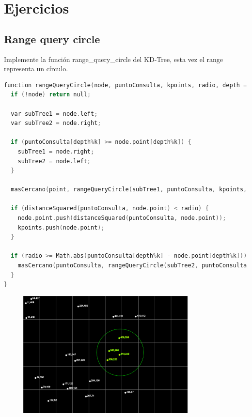\section{Ejercicios}
\subsection{Range query circle}
Implemente la función range\_query\_circle del KD-Tree, esta vez el range representa un círculo.
\begin{lstlisting}[language=c++,
                   directivestyle={\color{black}}
                   emph={int,char,double,float,unsigned},
                   emphstyle={\color{blue}}
                  ]
function rangeQueryCircle(node, puntoConsulta, kpoints, radio, depth = 0) {
  if (!node) return null;

  var subTree1 = node.left;
  var subTree2 = node.right;

  if (puntoConsulta[depth%k] >= node.point[depth%k]) {
    subTree1 = node.right;
    subTree2 = node.left;
  }

  masCercano(point, rangeQueryCircle(subTree1, puntoConsulta, kpoints, radio, depth + 1), node.point);

  if (distanceSquared(puntoConsulta, node.point) < radio) {
    node.point.push(distanceSquared(puntoConsulta, node.point));
    kpoints.push(node.point);
  }

  if (radio >= Math.abs(puntoConsulta[depth%k] - node.point[depth%k])) {
    masCercano(puntoConsulta, rangeQueryCircle(subTree2, puntoConsulta, kpoints, radio, depth + 1), node.point);
  }
}
\end{lstlisting}

\begin{figure}[H]
  \centering
  \includegraphics[width=0.8\textwidth]{images/7b.png}
  \label{fig:act-7b}
\end{figure}

